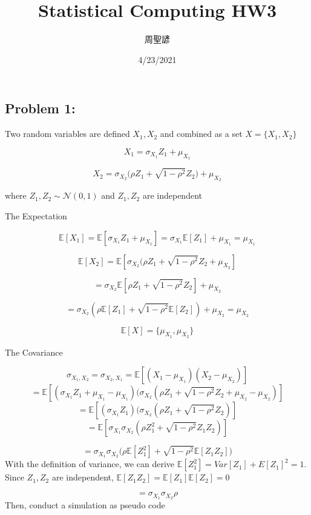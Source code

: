 \documentclass[
]{article}
\title{Statistical Computing HW3}
\author{周聖諺}
\date{4/23/2021}
\begin{document}
\maketitle

\hypertarget{problem-1}{%
\subsection{Problem 1:}\label{problem-1}}

Two random variables are defined \(X_1, X_2\) and combined as a set
\(X = \{ X_1, X_2 \}\)

\[
X_1 = \sigma_{X_1} Z_1 + \mu_{X_1}
\]

\[
X_2 = \sigma_{X_2} \Big(\rho Z_1 + \sqrt{1 - \rho^2} Z_2 \Big)  + \mu_{X_2}
\]

where \(Z_1, Z_2 \sim \mathcal{N}(0, 1)\) and \(Z_1, Z_2\) are
independent

The Expectation

\[
\mathbb{E}[X_1] = \mathbb{E}[\sigma_{X_1} Z_1 + \mu_{X_1}] = \sigma_{X_1} \mathbb{E}[Z_1] + \mu_{X_1} = \mu_{X_1}
\]

\[
\mathbb{E}[X_2] = \mathbb{E}[\sigma_{X_2} (\rho Z_1 + \sqrt{1 - \rho^2} Z_2  + \mu_{X_2}]
\]

\[
= \sigma_{X_2} \mathbb{E}[\rho Z_1 + \sqrt{1 - \rho^2} Z_2]  + \mu_{X_2}
\]

\[
= \sigma_{X_2} (\rho \mathbb{E}[Z_1] + \sqrt{1 - \rho^2} \mathbb{E}[Z_2])  + \mu_{X_2} = \mu_{X_2}
\]

\[
\mathbb{E}[X] = \{ \mu_{X_1}, \mu_{X_2} \}
\]

The Covariance

\[
\sigma_{X_1, X_2} = \sigma_{X_2, X_1} = \mathbb{E}[(X_1 - \mu_{X_1})(X_2 - \mu_{X_2})]
\] \[
= \mathbb{E}[(\sigma_{X_1} Z_1 + \mu_{X_1} - \mu_{X_1})(\sigma_{X_2} (\rho Z_1 + \sqrt{1 - \rho^2} Z_2  + \mu_{X_2} - \mu_{X_2})]
\] \[
= \mathbb{E}[(\sigma_{X_1} Z_1)(\sigma_{X_2} (\rho Z_1 + \sqrt{1 - \rho^2} Z_2)]
\] \[
= \mathbb{E}[\sigma_{X_1} \sigma_{X_2}( \rho Z_1^2 + \sqrt{1 - \rho^2} Z_1 Z_2)]
\]

\[
= \sigma_{X_1} \sigma_{X_2} \Big( \rho \mathbb{E}[Z_1^2] + \sqrt{1 - \rho^2} \mathbb{E}[Z_1 Z_2] \Big)
\] With the definition of variance, we can derive
\(\mathbb{E}[Z_1^2] = Var[Z_1] + E[Z_1]^2 = 1\). Since \(Z_1, Z_2\) are
independent,
\(\mathbb{E}[Z_1 Z_2] = \mathbb{E}[Z_1] \mathbb{E}[Z_2] = 0\)

\[
= \sigma_{X_1} \sigma_{X_2} \rho
\] Then, conduct a simulation as pseudo code
\end{document}
